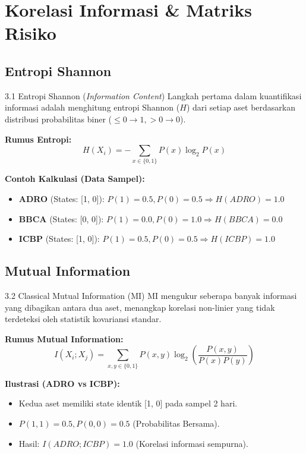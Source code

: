 \section{Korelasi Informasi \& Matriks Risiko}

\begin{frame}
\centering
{}
\end{frame}

\subsection{Entropi Shannon}
\begin{frame}{3.1 Entropi Shannon (\textit{Information Content})}
Langkah pertama dalam kuantifikasi informasi adalah menghitung entropi Shannon ($H$) dari setiap aset berdasarkan distribusi probabilitas biner ($\leq 0 \rightarrow 1, > 0 \rightarrow 0$).

\textbf{Rumus Entropi:}
\begin{equation}
H(X_i) = - \sum_{x \in \{0,1\}} P(x) \log_2 P(x)
\end{equation}

\textbf{Contoh Kalkulasi (Data Sampel):}
\begin{itemize}
    \item \textbf{ADRO} (States: [1, 0]): $P(1)=0.5, P(0)=0.5 \Rightarrow H(ADRO) = \mathbf{1.0}$
    \item \textbf{BBCA} (States: [0, 0]): $P(1)=0.0, P(0)=1.0 \Rightarrow H(BBCA) = \mathbf{0.0}$
    \item \textbf{ICBP} (States: [1, 0]): $P(1)=0.5, P(0)=0.5 \Rightarrow H(ICBP) = \mathbf{1.0}$
\end{itemize}
\end{frame}

\subsection{Mutual Information}
\begin{frame}{3.2 Classical Mutual Information (MI)}
MI mengukur seberapa banyak informasi yang dibagikan antara dua aset, menangkap korelasi non-linier yang tidak terdeteksi oleh statistik kovariansi standar.

\textbf{Rumus Mutual Information:}
\begin{equation}
I(X_i; X_j) = \sum_{x,y \in \{0,1\}} P(x,y) \log_2 \left( \frac{P(x,y)}{P(x)P(y)} \right)
\end{equation}

\textbf{Ilustrasi (ADRO vs ICBP):}
\begin{itemize}
    \item Kedua aset memiliki state identik [1, 0] pada sampel 2 hari.
    \item $P(1,1)=0.5, P(0,0)=0.5$ (Probabilitas Bersama).
    \item Hasil: $I(ADRO; ICBP) = 1.0$ (Korelasi informasi sempurna).
\end{itemize}
\end{frame}

